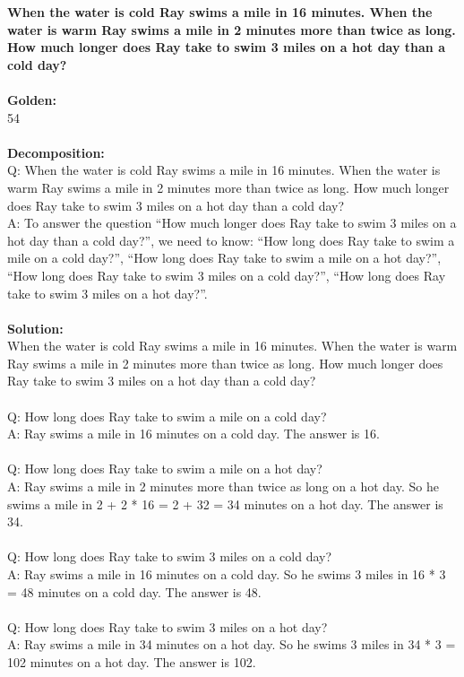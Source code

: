 \noindent
\textbf{When the water is cold Ray swims a mile in 16 minutes. When the water is warm Ray swims a mile in 2 minutes more than twice as long. How much longer does Ray take to swim 3 miles on a hot day than a cold day?} \\
 \\
\textbf{Golden:} \\
54 \\
 \\
\textbf{Decomposition:} \\
Q: When the water is cold Ray swims a mile in 16 minutes. When the water is warm Ray swims a mile in 2 minutes more than twice as long. How much longer does Ray take to swim 3 miles on a hot day than a cold day? \\
A: To answer the question ``How much longer does Ray take to swim 3 miles on a hot day than a cold day?'', we need to know: ``How long does Ray take to swim a mile on a cold day?'', ``How long does Ray take to swim a mile on a hot day?'', ``How long does Ray take to swim 3 miles on a cold day?'', ``How long does Ray take to swim 3 miles on a hot day?''. \\
 \\
\textbf{Solution:} \\
When the water is cold Ray swims a mile in 16 minutes. When the water is warm Ray swims a mile in 2 minutes more than twice as long. How much longer does Ray take to swim 3 miles on a hot day than a cold day? \\
 \\
Q: How long does Ray take to swim a mile on a cold day? \\
A: Ray swims a mile in 16 minutes on a cold day. The answer is 16. \\
 \\
Q: How long does Ray take to swim a mile on a hot day? \\
A: Ray swims a mile in 2 minutes more than twice as long on a hot day. So he swims a mile in 2 + 2 * 16 = 2 + 32 = 34 minutes on a hot day. The answer is 34. \\
 \\
Q: How long does Ray take to swim 3 miles on a cold day? \\
A: Ray swims a mile in 16 minutes on a cold day. So he swims 3 miles in 16 * 3 = 48 minutes on a cold day. The answer is 48. \\
 \\
Q: How long does Ray take to swim 3 miles on a hot day? \\
A: Ray swims a mile in 34 minutes on a hot day. So he swims 3 miles in 34 * 3 = 102 minutes on a hot day. The answer is 102. \\
